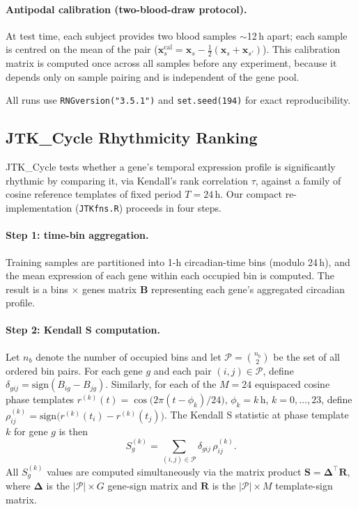 \documentclass[10pt,a4paper]{article}
\begin{document}
\paragraph{Antipodal calibration (two-blood-draw protocol).}
At test time, each subject provides two blood samples
${\sim}$12\,h apart; each sample is centred on the mean of the pair
($\mathbf{x}_s^{\mathrm{cal}} = \mathbf{x}_s -
\tfrac{1}{2}(\mathbf{x}_s + \mathbf{x}_{s'})$).
This calibration matrix is computed once across all samples before
any experiment, because it depends only on sample pairing and is
independent of the gene pool.
 
All runs use \texttt{RNGversion("3.5.1")} and
\texttt{set.seed(194)} for exact reproducibility.
 
\subsection{JTK\_Cycle Rhythmicity Ranking}
 
JTK\_Cycle \citep{Hughes2010} tests whether a gene's temporal
expression profile is significantly rhythmic by comparing it, via
Kendall's rank correlation $\tau$, against a family of cosine
reference templates of fixed period $T = 24$\,h.
Our compact re-implementation (\texttt{JTKfns.R}) proceeds in four
steps.
 
\paragraph{Step 1: time-bin aggregation.}
Training samples are partitioned into 1-h circadian-time bins
(modulo 24\,h), and the mean expression of each gene within each
occupied bin is computed.
The result is a bins $\times$ genes matrix $\mathbf{B}$ representing
each gene's aggregated circadian profile.
 
\paragraph{Step 2: Kendall S computation.}
Let $n_b$ denote the number of occupied bins and let
$\mathcal{P} = \binom{n_b}{2}$ be the set of all ordered bin pairs.
For each gene $g$ and each pair $(i,j) \in \mathcal{P}$, define
$\delta_{gij} = \mathrm{sign}(B_{ig} - B_{jg})$.
Similarly, for each of the $M = 24$ equispaced cosine phase
templates
$r^{(k)}(t) = \cos\!\bigl(2\pi(t - \phi_k)/24\bigr)$,
$\phi_k = k$\,h, $k = 0,\ldots,23$, define
$\rho_{ij}^{(k)} = \mathrm{sign}\!\bigl(r^{(k)}(t_i) -
r^{(k)}(t_j)\bigr)$.
The Kendall S statistic at phase template $k$ for gene $g$ is then
\begin{equation}
  S_g^{(k)} = \sum_{(i,j)\in\mathcal{P}}
               \delta_{gij}\,\rho_{ij}^{(k)}.
  \label{eq:kendallS}
\end{equation}
All $S_g^{(k)}$ values are computed simultaneously via the matrix
product $\mathbf{S} = \boldsymbol{\Delta}^\top \mathbf{R}$, where
$\boldsymbol{\Delta}$ is the $|\mathcal{P}| \times G$ gene-sign
matrix and $\mathbf{R}$ is the $|\mathcal{P}| \times M$ template-sign
matrix.
 
\end{document}
